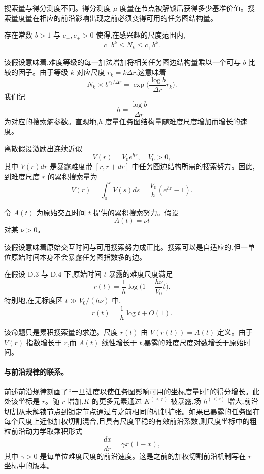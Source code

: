 搜索量与得分测度不同。得分测度 $\mu$ 度量在节点被解锁后获得多少基准价值。搜索量度量在相应的前沿影响出现之前必须变得可用的任务图结构量。

\begin{assumption}[自相似任务图边增长]
存在常数 $b > 1$ 与 $c_{-}, c_{+} > 0$ 使得,在感兴趣的尺度范围内,
\[
    c_{-} b^{k} \leq N_{k} \leq c_{+} b^{k}.
\]
\end{assumption}

该假设意味着,难度等级的每一加法增加将相关任务图边结构量乘以一个可与 $b$ 比较的因子。由于等级 $k$ 对应尺度 $r_{k} = k \Delta r$,这意味着
\[
    N_{k} \asymp b^{r_{k} / \Delta r} = \exp\!\biggl( \frac{\log b}{\Delta r} r_{k} \biggr).
\]
我们记
\[
    h = \frac{\log b}{\Delta r}
\]
为对应的搜索熵参数。直观地,$h$ 度量任务图结构量随难度尺度增加而增长的速度。

离散假设激励出连续近似
\[
    V(r) = V_{0} e^{h r}, \quad V_{0} > 0,
\]
其中 $V(r) dr$ 是暴露难度带 $[r, r + dr]$ 中任务图边结构所需的搜索努力。因此,到难度尺度 $r$ 的累积搜索量为
\[
    V(r) = \int_{0}^{r} V(s) ds = \frac{V_{0}}{h} (e^{h r} - 1).
\]

\begin{assumption}[线性搜索努力供给]
令 $A(t)$ 为原始交互时间 $t$ 提供的累积搜索努力。假设
\[
    A(t) = \nu t
\]
对某 $\nu > 0$。
\end{assumption}

该假设意味着原始交互时间与可用搜索努力成正比。搜索可以是自适应的,但一单位原始时间本身不会暴露任务图指数多的边。

\begin{proposition}[自相似任务几何给出对数时间]
在假设 D.3 与 D.4 下,原始时间 $t$ 暴露的难度尺度满足
\[
    r(t) = \frac{1}{h} \log \biggl( 1 + \frac{h \nu}{V_{0}} t \biggr).
\]
特别地,在无标度区 $t \gg V_{0} / (h \nu)$ 中,
\[
    r(t) = \frac{1}{h} \log t + O(1).
\]
\end{proposition}

该命题只是累积搜索量的求逆。尺度 $r(t)$ 由 $V(r(t)) = A(t)$ 定义。由于 $V(r)$ 指数增长于 $r$,而 $A(t)$ 线性增长于 $t$,暴露的难度尺度对数增长于原始时间。

\paragraph{与前沿规律的联系。} 前述前沿规律刻画了``一旦进度以使任务图影响可用的坐标度量时''的得分增长。此处该坐标是 $r$。随 $r$ 增加,$K$ 的更多元素通过 $K^{(\leq r)}$ 被暴露,场 $h^{(\leq r)}$ 增大,前沿切割从未解锁节点到锁定节点通过与之前相同的机制扩张。如果已暴露的任务图在每个尺度上近似加权切割混合,且具有尺度平稳的有效前沿系数,则尺度坐标中的粗粒前沿动力学取乘积形式
\[
    \frac{dx}{dr} = \gamma x(1 - x),
\]
其中 $\gamma > 0$ 是每单位难度尺度的前沿速度。这是之前的加权切割前沿机制写在 $r$ 坐标中的版本。


